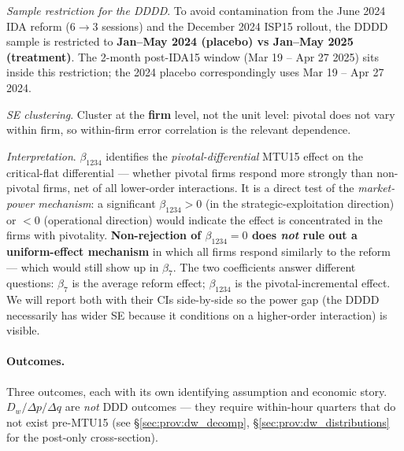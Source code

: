 \documentclass[11pt,a4paper]{article}
\begin{document}
\textit{Sample restriction for the DDDD}. To avoid contamination from the June 2024 IDA reform (6$\to$3 sessions) and the December 2024 ISP15 rollout, the DDDD sample is restricted to \textbf{Jan--May 2024 (placebo) vs Jan--May 2025 (treatment)}. The 2-month post-IDA15 window (Mar 19 -- Apr 27 2025) sits inside this restriction; the 2024 placebo correspondingly uses Mar 19 -- Apr 27 2024.

\textit{SE clustering}. Cluster at the \textbf{firm} level, not the unit level: pivotal does not vary within firm, so within-firm error correlation is the relevant dependence.

\textit{Interpretation}. $\beta_{1234}$ identifies the \emph{pivotal-differential} MTU15 effect on the critical-flat differential --- whether pivotal firms respond more strongly than non-pivotal firms, net of all lower-order interactions. It is a direct test of the \emph{market-power mechanism}: a significant $\beta_{1234} > 0$ (in the strategic-exploitation direction) or $< 0$ (operational direction) would indicate the effect is concentrated in the firms with pivotality. \textbf{Non-rejection of $\beta_{1234} = 0$ does \emph{not} rule out a uniform-effect mechanism} in which all firms respond similarly to the reform --- which would still show up in $\beta_7$. The two coefficients answer different questions: $\beta_7$ is the average reform effect; $\beta_{1234}$ is the pivotal-incremental effect. We will report both with their CIs side-by-side so the power gap (the DDDD necessarily has wider SE because it conditions on a higher-order interaction) is visible.

\paragraph{Outcomes.} Three outcomes, each with its own identifying assumption and economic story. $D_w / \Delta p / \Delta q$ are \emph{not} DDD outcomes --- they require within-hour quarters that do not exist pre-MTU15 (see \S\ref{sec:prov:dw_decomp}, \S\ref{sec:prov:dw_distributions} for the post-only cross-section).
\end{document}

